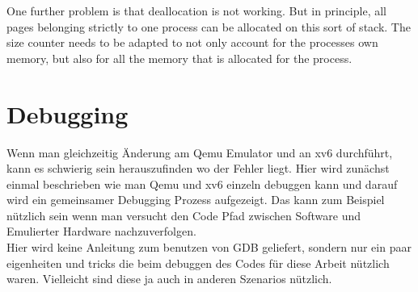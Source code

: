 One further problem is that deallocation is not working. But in principle, all pages belonging
strictly to one process can be allocated on this sort of stack. The size counter
needs to be adapted to not only account for the processes own memory, but also
for all the memory that is allocated for the process.








\section{Debugging}
Wenn man gleichzeitig Änderung am Qemu Emulator und an xv6 durchführt, kann es schwierig sein
herauszufinden wo der Fehler liegt. Hier wird zunächst einmal beschrieben wie man Qemu und
xv6 einzeln debuggen kann und darauf wird ein gemeinsamer Debugging Prozess aufgezeigt.
Das kann zum Beispiel nützlich sein wenn man versucht den Code Pfad zwischen Software und
Emulierter Hardware nachzuverfolgen.\\
Hier wird keine Anleitung zum benutzen von GDB geliefert, sondern nur ein paar eigenheiten
und tricks die beim debuggen des Codes für diese Arbeit nützlich waren. Vielleicht sind
diese ja auch in anderen Szenarios nützlich.

